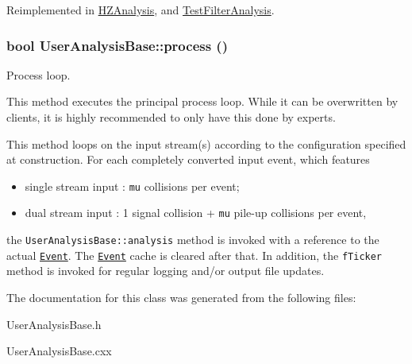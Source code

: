 Reimplemented in \hyperlink{classHZAnalysis_b2b6a462ad983ce4b847c7c010df6ec8}{HZAnalysis}, and \hyperlink{classTestFilterAnalysis_b277393b1e443de3c4f12e0c54a72694}{Test\-Filter\-Analysis}.\hypertarget{classUserAnalysisBase_b854df840f749f7f9dd5bb2ca9447c25}{
\subsubsection[process]{\setlength{\rightskip}{0pt plus 5cm}bool User\-Analysis\-Base::process ()}}
\label{classUserAnalysisBase_b854df840f749f7f9dd5bb2ca9447c25}


Process loop. 

This method executes the principal process loop. While it can be overwritten by clients, it is highly recommended to only have this done by experts.

This method loops on the input stream(s) according to the configuration specified at construction. For each completely converted input event, which features

\begin{itemize}
\item single  stream  input : {\tt mu} collisions per event;\item dual  stream  input : 1 signal collision + {\tt mu} pile-up collisions per event,\end{itemize}


the {\tt User\-Analysis\-Base::analysis} method is invoked with a reference to the actual {\tt \hyperlink{classEvent}{Event}}. The {\tt \hyperlink{classEvent}{Event}} cache is cleared after that. In addition, the {\tt f\-Ticker} method is invoked for regular logging and/or output file updates. 

The documentation for this class was generated from the following files:\begin{CompactItemize}
\item 
User\-Analysis\-Base.h\item 
User\-Analysis\-Base.cxx\end{CompactItemize}
